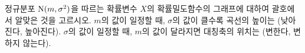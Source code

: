정규분포 $\mathrm{N}(m{,}\mkern3mu\mathopen{}\sigma^2)$을 따르는 확률변수 $X$의 확률밀도함수의 그래프에 대하여 괄호에서 알맞은 것을 고르시오.
 $m$의 값이 일정할 때, $\sigma$의 값이 클수록 곡선의 높이는 (낮아진다, 높아진다).
 $\sigma$의 값이 일정할 때, $m$의 값이 달라지면 대칭축의 위치는 (변한다, 변하지 않는다).
